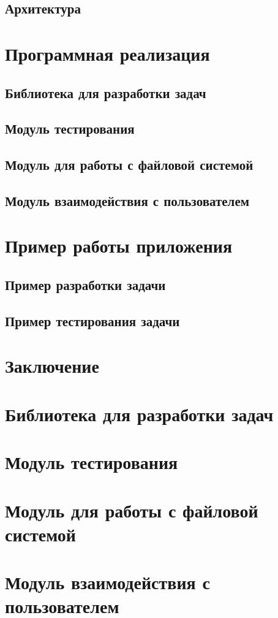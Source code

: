 \section{Архитектура}


\chapter{Программная реализация}
\section{Библиотека для разработки задач}

\section{Модуль тестирования}

\section{Модуль для работы с файловой системой}

\section{Модуль взаимодействия с пользователем}


\chapter{Пример работы приложения}
\section{Пример разработки задачи}

\section{Пример тестирования задачи}


\chapter*{Заключение}




\newpage
\appendix
{}
\footnotesize
\chapter{Библиотека для разработки задач}

\chapter{Модуль тестирования}

\chapter{Модуль для работы с файловой системой}

\chapter{Модуль взаимодействия с пользователем}


